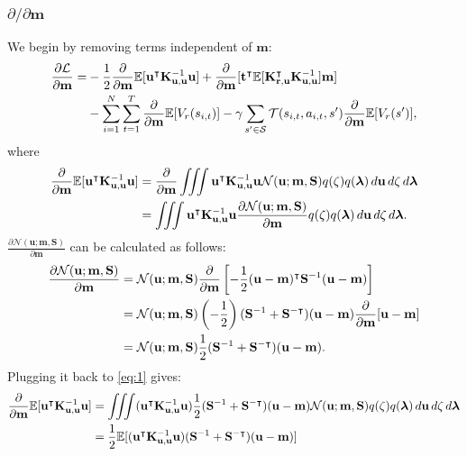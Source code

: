 \documentclass{mprop}
\theoremstyle{definition}
\begin{document}
\subsubsection{$\partial/\partial\mathbf{m}$}

We begin by removing terms independent of $\mathbf{m}$:
\[
  \begin{split}
    \frac{\partial\mathcal{L}}{\partial\mathbf{m}} =
    &-\frac{1}{2}\frac{\partial}{\partial\mathbf{m}}\mathbb{E}[\mathbf{u}^\intercal\mathbf{K}_{\mathbf{u},\mathbf{u}}^{-1}\mathbf{u}]
    + \frac{\partial}{\partial\mathbf{m}}[\mathbf{t}^\intercal\mathbb{E}[\mathbf{K}_{\mathbf{r},\mathbf{u}}^\intercal\mathbf{K}_{\mathbf{u},\mathbf{u}}^{-1}]\mathbf{m}] \\
    &- \sum_{i=1}^N \sum_{t=1}^T \frac{\partial}{\partial\mathbf{m}}\mathbb{E}[V_r(s_{i,t})] -
      \gamma\sum_{s' \in \mathcal{S}} \mathcal{T}(s_{i,t}, a_{i,t},
      s')\frac{\partial}{\partial\mathbf{m}}\mathbb{E}[V_r(s')],
  \end{split}
\]
where
\begin{equation} \label{eq:1}
\begin{split} %
    \dm\mathbb{E}[\mathbf{u}^\intercal\Kuu^{-1}\mathbf{u}] &=
    \dm\iiint\mathbf{u}^\intercal\Kuu^{-1}\mathbf{u}\mathcal{N}(\mathbf{u};
    \mathbf{m},
    \mathbf{S})q(\zeta)q(\bm\lambda)\,d\mathbf{u}\,d\zeta\,d\bm\lambda \\
    &= \iiint\mathbf{u}^\intercal\Kuu^{-1}\mathbf{u}\frac{\partial \mathcal{N}(\mathbf{u}; \mathbf{m}, \mathbf{S})}{\partial \mathbf{m}} q(\zeta)q(\bm\lambda)\,d\mathbf{u}\,d\zeta\,d\bm\lambda.
  \end{split}
\end{equation}
$\frac{\partial \mathcal{N}(\mathbf{u}; \mathbf{m}, \mathbf{S})}{\partial \mathbf{m}}$ can be calculated as
follows: %
\[
  \begin{split}
    \frac{\partial \mathcal{N}(\mathbf{u}; \mathbf{m}, \mathbf{S})}{\partial\mathbf{m}} &=
    \mathcal{N}(\mathbf{u}; \mathbf{m},
    \mathbf{S})\frac{\partial}{\partial\mathbf{m}}\left[-\frac{1}{2}(\mathbf{u} -
      \mathbf{m})^\intercal\mathbf{S}^{-1}(\mathbf{u} - \mathbf{m})\right] \\
    &= \mathcal{N}(\mathbf{u}; \mathbf{m},
    \mathbf{S})\left(-\frac{1}{2}\right)(\mathbf{S}^{-1} +
    \mathbf{S}^{-\intercal})(\mathbf{u} - \mathbf{m})\frac{\partial}{\partial\mathbf{m}}[\mathbf{u} -
    \mathbf{m}] \\
    &= \mathcal{N}(\mathbf{u}; \mathbf{m},
    \mathbf{S})\frac{1}{2}(\mathbf{S}^{-1} + \mathbf{S}^{-\intercal})(\mathbf{u}
    - \mathbf{m}).
  \end{split}
\]
Plugging it back to \eqref{eq:1} gives:
\[
  \begin{split}
    \frac{\partial}{\partial\mathbf{m}}\mathbb{E}[\mathbf{u}^\intercal\mathbf{K}_{\mathbf{u},\mathbf{u}}^{-1}\mathbf{u}] &=
    \iiint(\mathbf{u}^\intercal\mathbf{K}_{\mathbf{u},\mathbf{u}}^{-1}\mathbf{u})\frac{1}{2}(\mathbf{S}^{-1} +
    \mathbf{S}^{-\intercal})(\mathbf{u} - \mathbf{m})\mathcal{N}(\mathbf{u};
    \mathbf{m},
    \mathbf{S})q(\zeta)q(\bm\lambda)\,d\mathbf{u}\,d\zeta\,d\bm\lambda \\
    &=
    \frac{1}{2}\mathbb{E}[(\mathbf{u}^\intercal\mathbf{K}_{\mathbf{u},\mathbf{u}}^{-1}\mathbf{u})(\mathbf{S}^{-1}
    + \mathbf{S}^{-\intercal})(\mathbf{u} - \mathbf{m})]
  \end{split}
\]
\end{document}
